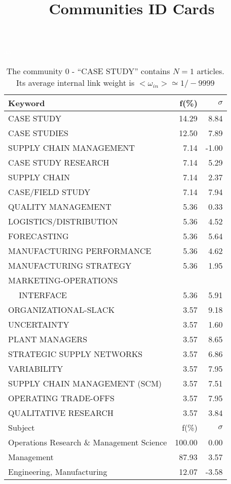 \documentclass[a4paper,11pt]{report}
\title{{\bf Communities ID Cards}}
\date{\begin{flushleft}This document gather the ``ID Cards'' of the CC communities found within your database.\\
 The CC network was built by keeping a link between articles sharing at least 10 references. The communities characterized here correspond to the ones found in the level 0 (in the sense of the Louvain algo) which gathers more than 0 articles.\\
 These ID cards displays the most frequent keywords, subject categories, journals of publication, institution, countries, authors, references and reference journals of the articles of each community. The significance of an item $\sigma = \sqrt{N} (f - p) / \sqrt{p(1-p)}$ [where $N$ is the number of articles within the community and $f$ and $p$ are the proportion of articles respectively within the community and within the database displaying that item ] is also given (for example $\sigma > 5$ is really highly significant).\\
\vspace{1cm}
\copyright Sebastian Grauwin, Liu Weizhi - (2014) \end{flushleft}}
\begin{document}
\begin{landscape}
\maketitle
\clearpage

\begin{table}[!ht]
\caption{The community 0 - ``CASE STUDY'' contains $N = 1$ articles. Its average internal link weight is $<\omega_{in}> \simeq 1/-9999$ }
\textcolor{white}{aa}\\
{\scriptsize\begin{tabular}{|l r r|}
\hline
Keyword & f(\%) & $\sigma$\\
\hline
CASE STUDY & 14.29 & 8.84\\
CASE STUDIES & 12.50 & 7.89\\
SUPPLY CHAIN MANAGEMENT & 7.14 & -1.00\\
CASE STUDY RESEARCH & 7.14 & 5.29\\
SUPPLY CHAIN & 7.14 & 2.37\\
CASE/FIELD STUDY & 7.14 & 7.94\\
QUALITY MANAGEMENT & 5.36 & 0.33\\
LOGISTICS/DISTRIBUTION & 5.36 & 4.52\\
FORECASTING & 5.36 & 5.64\\
MANUFACTURING PERFORMANCE & 5.36 & 4.62\\
MANUFACTURING STRATEGY & 5.36 & 1.95\\
MARKETING-OPERATIONS &  & \\
$\quad$ INTERFACE & 5.36 & 5.91\\
ORGANIZATIONAL-SLACK & 3.57 & 9.18\\
UNCERTAINTY & 3.57 & 1.60\\
PLANT MANAGERS & 3.57 & 8.65\\
STRATEGIC SUPPLY NETWORKS & 3.57 & 6.86\\
VARIABILITY & 3.57 & 7.95\\
SUPPLY CHAIN MANAGEMENT (SCM) & 3.57 & 7.51\\
OPERATING TRADE-OFFS & 3.57 & 7.95\\
QUALITATIVE RESEARCH & 3.57 & 3.84\\
\hline
\hline
Subject & f(\%) & $\sigma$\\
\hline
Operations Research \& Management Science & 100.00 & 0.00\\
Management & 87.93 & 3.57\\
Engineering, Manufacturing & 12.07 & -3.58\\

\end{tabular}}
\end{table}
\end{landscape}
\end{document}
